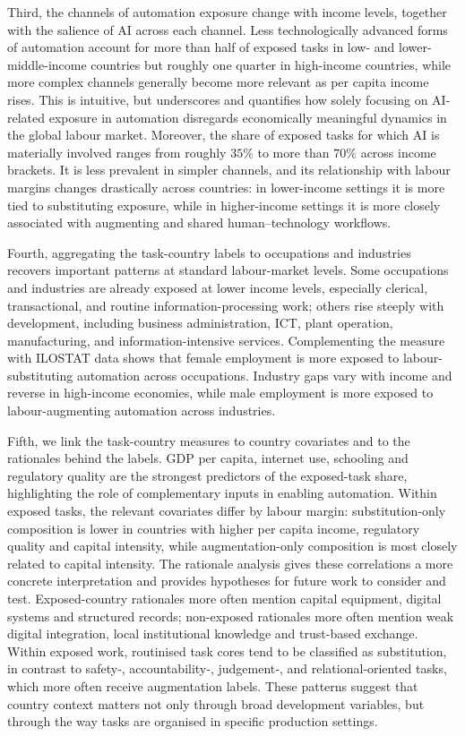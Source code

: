 \documentclass[11pt]{article}
\begin{document}
Third, the channels of automation exposure change with income levels, together with the salience of AI across each channel. Less technologically advanced forms of automation account for more than half of exposed tasks in low- and lower-middle-income countries but roughly one quarter in high-income countries, while more complex channels generally become more relevant as per capita income rises. This is intuitive, but underscores and quantifies how solely focusing on AI-related exposure in automation disregards economically meaningful dynamics in the global labour market. Moreover, the share of exposed tasks for which AI is materially involved ranges from roughly $35\%$ to more than $70\%$ across income brackets. It is less prevalent in simpler channels, and its relationship with labour margins changes drastically across countries: in lower-income settings it is more tied to substituting exposure, while in higher-income settings it is more closely associated with augmenting and shared human--technology workflows.

Fourth, aggregating the task-country labels to occupations and industries recovers important patterns at standard labour-market levels. Some occupations and industries are already exposed at lower income levels, especially clerical, transactional, and routine information-processing work; others rise steeply with development, including business administration, ICT, plant operation, manufacturing, and information-intensive services. Complementing the measure with ILOSTAT data shows that female employment is more exposed to labour-substituting automation across occupations. Industry gaps vary with income and reverse in high-income economies, while male employment is more exposed to labour-augmenting automation across industries.


Fifth, we link the task-country measures to country covariates and to the rationales behind the labels. GDP per capita, internet use, schooling and regulatory quality are the strongest predictors of the exposed-task share, highlighting the role of complementary inputs in enabling automation. Within exposed tasks, the relevant covariates differ by labour margin: substitution-only composition is lower in countries with higher per capita income, regulatory quality and capital intensity, while augmentation-only composition is most closely related to capital intensity. The rationale analysis gives these correlations a more concrete interpretation and provides hypotheses for future work to consider and test. Exposed-country rationales more often mention capital equipment, digital systems and structured records; non-exposed rationales more often mention weak digital integration, local institutional knowledge and trust-based exchange. Within exposed work, routinised task cores tend to be classified as substitution, in contrast to safety‑, accountability‑, judgement‑, and relational‑oriented tasks, which more often receive augmentation labels. These patterns suggest that country context matters not only through broad development variables, but through the way tasks are organised in specific production settings.
\end{document}
